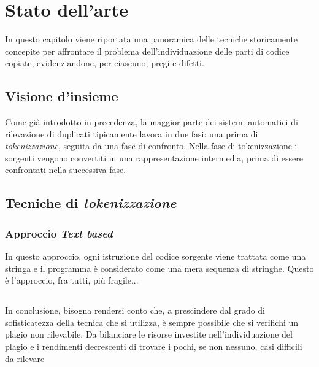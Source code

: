 \chapter{Stato dell'arte}
\label{chapter:stateOfArt}
In questo capitolo viene riportata una panoramica delle tecniche storicamente concepite per affrontare il problema dell'individuazione delle parti di codice copiate, evidenziandone, per ciascuno, pregi e difetti.

\section{Visione d'insieme}
Come già introdotto in precedenza, la maggior parte dei sistemi automatici di rilevazione di duplicati tipicamente lavora in due fasi: una prima di \textit{tokenizzazione}, seguita da una fase di confronto.
%
Nella fase di tokenizzazione i sorgenti vengono convertiti in una rappresentazione intermedia, prima di essere confrontati nella successiva fase.

\section{Tecniche di \textit{tokenizzazione}}

\subsection{Approccio \textit{Text based}}
In questo approccio, ogni istruzione del codice sorgente viene trattata come una stringa e il programma è considerato come una mera sequenza di stringhe.
%
Questo è l'approccio, fra tutti, più fragile...

\section{}

In conclusione, bisogna rendersi conto che, a prescindere dal grado di sofisticatezza della tecnica che si utilizza, è sempre possibile che si verifichi un plagio non rilevabile.
%
Da bilanciare le risorse investite nell'individuazione del plagio e i rendimenti decrescenti di trovare i pochi, se non nessuno, casi difficili da rilevare \cite{joy-99}
